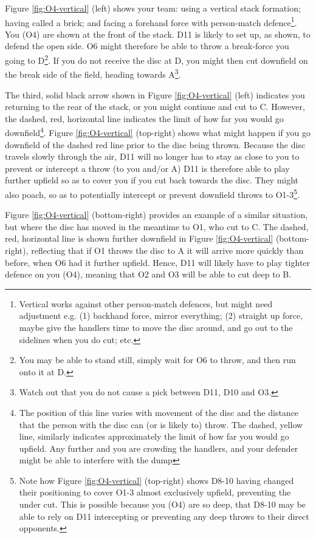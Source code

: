 \documentclass{tufte-handout}
\begin{document}
Figure \ref{fig:O4-vertical} (left) shows 
your team: 
using 
a vertical stack formation; 
having called a brick; and
facing a 
forehand force with 
person-match defence\footnote{
Vertical works
against other person-match defences, 
but might need 
adjustment e.g. 
(1) backhand force,
mirror everything;
(2) straight up force, 
maybe give the handlers 
time to move the disc around, 
and go out to the sidelines
when you do cut; etc.}. 
You (O4) 
are shown 
at the front 
of the stack.
D11 
is likely to set up, 
as shown, 
to defend the open side. 
O6 might
therefore be 
able to 
throw a break-force 
you going to D\footnote{
You may
be able to stand still, 
simply wait for O6 
to throw, 
and then run onto 
it at D.}.
If you do not 
receive the disc 
at D, 
you might then 
cut downfield 
on the break side 
of the field, 
heading towards 
A\footnote{
Watch out that you 
do not cause a pick 
between D11, 
D10 and O3.}.  

The third, 
solid black arrow
shown in 
Figure \ref{fig:O4-vertical} (left) 
indicates you 
returning to 
the rear of the stack, 
or you might continue 
and cut to C. 
However, the dashed, 
red, 
horizontal line 
indicates the limit 
of how far you 
would go downfield\footnote{
The position of 
this line 
varies with movement 
of the disc and the distance 
that the person with the disc 
can (or is likely to) throw.
The dashed, 
yellow line, 
similarly indicates 
approximately the
limit of how far you 
would go upfield.  
Any further and
you are crowding the handlers, 
and your defender 
might be able to interfere 
with the dump}. 
Figure \ref{fig:O4-vertical} (top-right) shows 
what might happen 
if you go downfield of
the dashed red line 
prior to the disc being thrown. 
Because the disc travels slowly 
through the air, 
D11 will no longer has to stay as close to you 
to prevent or intercept a throw 
(to you and/or A)
D11 is therefore able to play 
further upfield 
so as to 
cover you if you 
cut back towards 
the disc. 
They might also 
poach, so as to 
potentially intercept
or prevent 
downfield throws 
to O1-3\footnote{
Note how Figure \ref{fig:O4-vertical} (top-right)  
shows D8-10 
having changed their 
positioning 
to cover O1-3
almost exclusively upfield, 
preventing the under cut.  
This is possible because you (O4) 
are so deep, 
that D8-10 may be 
able to rely on 
D11 intercepting 
or preventing any deep throws 
to their direct opponents.}. 

Figure \ref{fig:O4-vertical} (bottom-right)  
provides an example 
of a similar situation, but 
where the disc has moved 
in the meantime to O1, 
who cut to C.  
The dashed,
red,
horizontal line 
is shown 
further downfield in 
Figure \ref{fig:O4-vertical} (bottom-right), 
reflecting that if O1 
throws the disc to 
A it will arrive 
more quickly than before, 
when O6 had it further upfield. 
Hence, D11 will likely 
have to play tighter defence 
on you (O4), 
meaning that O2 and O3 
will be able to cut deep to B.
\end{document}
